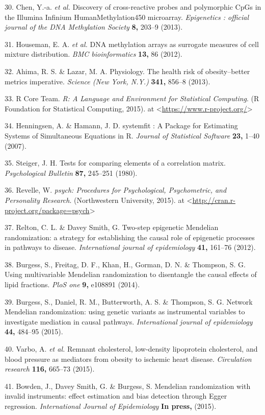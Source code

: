 \documentclass[]{article}
\begin{document}
\hypertarget{ref-Chen2013a}{}
30. Chen, Y.-a. \emph{et al.} Discovery of cross-reactive probes and
polymorphic CpGs in the Illumina Infinium HumanMethylation450
microarray. \emph{Epigenetics : official journal of the DNA Methylation
Society} \textbf{8,} 203--9 (2013).

\hypertarget{ref-Houseman2012}{}
31. Houseman, E. A. \emph{et al.} DNA methylation arrays as surrogate
measures of cell mixture distribution. \emph{BMC bioinformatics}
\textbf{13,} 86 (2012).

\hypertarget{ref-Ahima2013}{}
32. Ahima, R. S. \& Lazar, M. A. Physiology. The health risk of
obesity--better metrics imperative. \emph{Science (New York, N.Y.)}
\textbf{341,} 856--8 (2013).

\hypertarget{ref-RCoreTeam2015}{}
33. R Core Team. \emph{R: A Language and Environment for Statistical
Computing}. (R Foundation for Statistical Computing, 2015). at
\textless{}\url{https://www.r-project.org/}\textgreater{}

\hypertarget{ref-Henningsen2007}{}
34. Henningsen, A. \& Hamann, J. D. systemfit : A Package for Estimating
Systems of Simultaneous Equations in R. \emph{Journal of Statistical
Software} \textbf{23,} 1--40 (2007).

\hypertarget{ref-Steiger1980}{}
35. Steiger, J. H. Tests for comparing elements of a correlation matrix.
\emph{Psychological Bulletin} \textbf{87,} 245--251 (1980).

\hypertarget{ref-Revelle2015}{}
36. Revelle, W. \emph{psych: Procedures for Psychological, Psychometric,
and Personality Research}. (Northwestern University, 2015). at
\textless{}\url{http://cran.r-project.org/package=psych}\textgreater{}

\hypertarget{ref-Relton2012}{}
37. Relton, C. L. \& Davey Smith, G. Two-step epigenetic Mendelian
randomization: a strategy for establishing the causal role of epigenetic
processes in pathways to disease. \emph{International journal of
epidemiology} \textbf{41,} 161--76 (2012).

\hypertarget{ref-Burgess2014a}{}
38. Burgess, S., Freitag, D. F., Khan, H., Gorman, D. N. \& Thompson, S.
G. Using multivariable Mendelian randomization to disentangle the causal
effects of lipid fractions. \emph{PloS one} \textbf{9,} e108891 (2014).

\hypertarget{ref-Burgess2015}{}
39. Burgess, S., Daniel, R. M., Butterworth, A. S. \& Thompson, S. G.
Network Mendelian randomization: using genetic variants as instrumental
variables to investigate mediation in causal pathways.
\emph{International journal of epidemiology} \textbf{44,} 484--95
(2015).

\hypertarget{ref-Varbo2015}{}
40. Varbo, A. \emph{et al.} Remnant cholesterol, low-density lipoprotein
cholesterol, and blood pressure as mediators from obesity to ischemic
heart disease. \emph{Circulation research} \textbf{116,} 665--73 (2015).

\hypertarget{ref-Bowden2015}{}
41. Bowden, J., Davey Smith, G. \& Burgess, S. Mendelian randomization
with invalid instruments: effect estimation and bias detection through
Egger regression. \emph{International Journal of Epidemiology}
\textbf{In press,} (2015).
\end{document}
